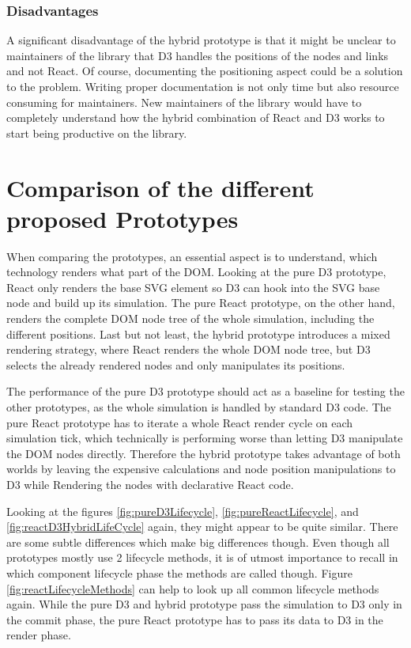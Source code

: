 \subsubsection{Disadvantages}
\label{subsub:hybridDisadvantages}

A significant disadvantage of the hybrid prototype is that it might be unclear to maintainers of the library that D3 handles the positions of the nodes and links and not React. Of course, documenting the positioning aspect could be a solution to the problem. Writing proper documentation is not only time but also resource consuming for maintainers. New maintainers of the library would have to completely understand how the hybrid combination of React and D3 works to start being productive on the library.

\section{Comparison of the different proposed Prototypes}

When comparing the prototypes, an essential aspect is to understand, which technology renders what part of the DOM. Looking at the pure D3 prototype, React only renders the base SVG element so D3 can hook into the SVG base node and build up its simulation. The pure React prototype, on the other hand, renders the complete DOM node tree of the whole simulation, including the different positions. Last but not least, the hybrid prototype introduces a mixed rendering strategy, where React renders the whole DOM node tree, but D3 selects the already rendered nodes and only manipulates its positions.

The performance of the pure D3 prototype should act as a baseline for testing the other prototypes, as the whole simulation is handled by standard D3 code. The pure React prototype has to iterate a whole React render cycle on each simulation tick, which technically is performing worse than letting D3 manipulate the DOM nodes directly. Therefore the hybrid prototype takes advantage of both worlds by leaving the expensive calculations and node position manipulations to D3 while Rendering the nodes with declarative React code.

Looking at the figures \ref{fig:pureD3Lifecycle}, \ref{fig:pureReactLifecycle}, and \ref{fig:reactD3HybridLifeCycle} again, they might appear to be quite similar. There are some subtle differences which make big differences though. Even though all prototypes mostly use 2 lifecycle methods, it is of utmost importance to recall in which component lifecycle phase the methods are called though. Figure \ref{fig:reactLifecycleMethods} can help to look up all common lifecycle methods again. While the pure D3 and hybrid prototype pass the simulation to D3 only in the commit phase, the pure React prototype has to pass its data to D3 in the render phase.

